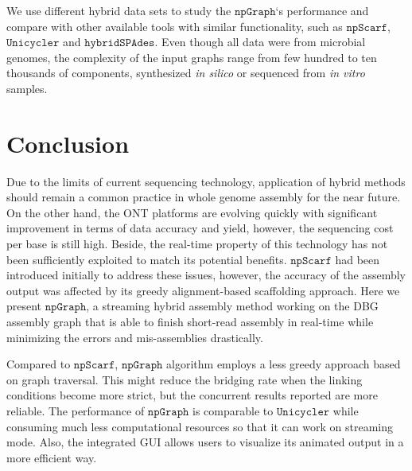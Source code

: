 \documentclass[10pt,twocolumn,twoside]{genpaper}
\newcommand{\npscarf}{$\mathtt{npScarf}$}
\newcommand{\npgraph}{$\mathtt{npGraph}$}
\newcommand{\unicycler}{$\mathtt{Unicycler}$}
\newcommand{\hspades}{$\mathtt{hybridSPAdes}$}
\begin{document}
We use different hybrid data sets to study the \npgraph{}`s performance and compare with other available tools with similar functionality, such as \npscarf{}, \unicycler{} and \hspades{}. Even though all data were from microbial genomes, the complexity of the input graphs range from few hundred to ten thousands of components, synthesized \emph{in silico} or sequenced from \emph{in vitro} samples.



\section*{Conclusion}
Due to the limits of current sequencing technology, application of hybrid methods should remain a common practice in whole genome assembly for the near future.
On the other hand, the ONT platforms are evolving quickly with significant improvement in terms of data accuracy and yield, however, the sequencing cost per base is still high. Beside, the real-time property of this technology has not been sufficiently exploited to match its potential benefits.
\npscarf{} had been introduced initially to address these issues, however, the accuracy of the assembly output was affected by its greedy alignment-based scaffolding approach.
Here we present \npgraph{}, a streaming hybrid assembly method working on the DBG assembly graph that is able to finish short-read assembly in real-time while minimizing the errors and mis-assemblies drastically.

Compared to \npscarf, \npgraph{} algorithm employs a less greedy approach based on graph traversal. This might reduce the bridging rate when the linking conditions become more strict, but the concurrent results reported are more reliable.
The performance of \npgraph{} is comparable to \unicycler{} while consuming much less computational resources so that it can work on streaming mode. 
Also, the integrated GUI allows users to visualize its animated output in a  more efficient way.
\end{document}
